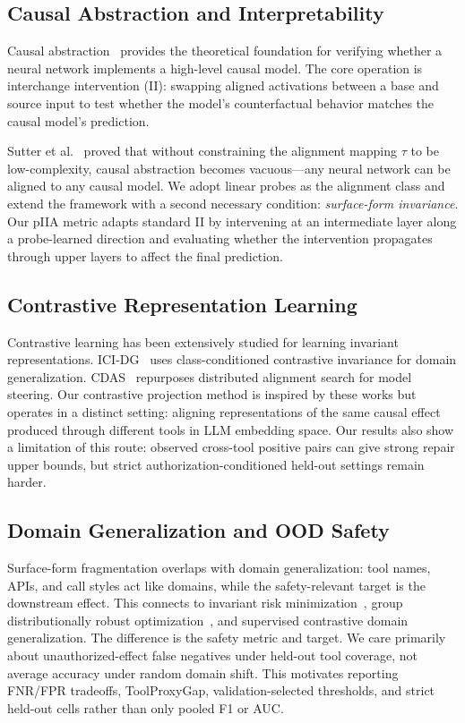 \documentclass{article}
\begin{document}
\subsection{Causal Abstraction and Interpretability}

Causal abstraction~\cite{geiger2021, geiger2025} provides the theoretical foundation for verifying whether a neural network implements a high-level causal model. The core operation is interchange intervention (II): swapping aligned activations between a base and source input to test whether the model's counterfactual behavior matches the causal model's prediction.

Sutter et al.~\cite{sutter2025} proved that without constraining the alignment mapping $\tau$ to be low-complexity, causal abstraction becomes vacuous---any neural network can be aligned to any causal model. We adopt linear probes as the alignment class and extend the framework with a second necessary condition: \emph{surface-form invariance}. Our pIIA metric adapts standard II by intervening at an intermediate layer along a probe-learned direction and evaluating whether the intervention propagates through upper layers to affect the final prediction.

\subsection{Contrastive Representation Learning}

Contrastive learning has been extensively studied for learning invariant representations. ICI-DG~\cite{icidg2026} uses class-conditioned contrastive invariance for domain generalization. CDAS~\cite{cdas2026} repurposes distributed alignment search for model steering. Our contrastive projection method is inspired by these works but operates in a distinct setting: aligning representations of the same causal effect produced through different tools in LLM embedding space. Our results also show a limitation of this route: observed cross-tool positive pairs can give strong repair upper bounds, but strict authorization-conditioned held-out settings remain harder.

\subsection{Domain Generalization and OOD Safety}

Surface-form fragmentation overlaps with domain generalization: tool names, APIs, and call styles act like domains, while the safety-relevant target is the downstream effect. This connects to invariant risk minimization~\cite{irm2019}, group distributionally robust optimization~\cite{groupdro2020}, and supervised contrastive domain generalization. The difference is the safety metric and target. We care primarily about unauthorized-effect false negatives under held-out tool coverage, not average accuracy under random domain shift. This motivates reporting FNR/FPR tradeoffs, ToolProxyGap, validation-selected thresholds, and strict held-out cells rather than only pooled F1 or AUC.
\end{document}

